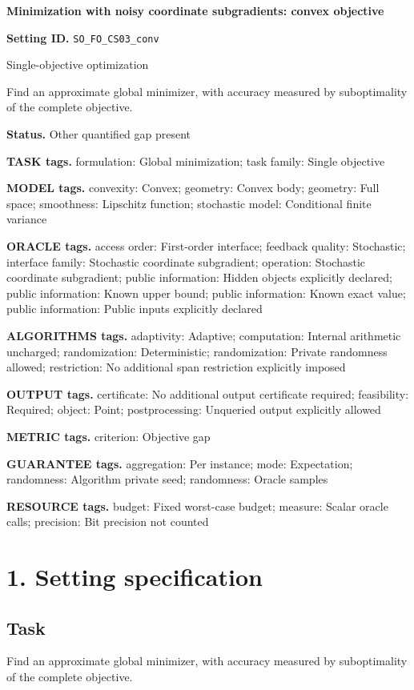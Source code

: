 \documentclass[10pt,a4paper]{article}
\begin{document}
\raggedright

{\LARGE\bfseries\sffamily\color{AtlasNavy} Minimization with noisy coordinate subgradients: convex objective\par}\vspace{5pt}
\textbf{Setting ID.} \texttt{SO\_\allowbreak{}FO\_\allowbreak{}CS03\_\allowbreak{}conv}

Single-objective optimization

Find an approximate global minimizer, with accuracy measured by suboptimality of the complete objective.

\textbf{Status.} Other quantified gap present

\textbf{TASK tags.} formulation: Global minimization; task family: Single objective

\textbf{MODEL tags.} convexity: Convex; geometry: Convex body; geometry: Full space; smoothness: Lipschitz function; stochastic model: Conditional finite variance

\textbf{ORACLE tags.} access order: First-order interface; feedback quality: Stochastic; interface family: Stochastic coordinate subgradient; operation: Stochastic coordinate subgradient; public information: Hidden objects explicitly declared; public information: Known upper bound; public information: Known exact value; public information: Public inputs explicitly declared

\textbf{ALGORITHMS tags.} adaptivity: Adaptive; computation: Internal arithmetic uncharged; randomization: Deterministic; randomization: Private randomness allowed; restriction: No additional span restriction explicitly imposed

\textbf{OUTPUT tags.} certificate: No additional output certificate required; feasibility: Required; object: Point; postprocessing: Unqueried output explicitly allowed

\textbf{METRIC tags.} criterion: Objective gap

\textbf{GUARANTEE tags.} aggregation: Per instance; mode: Expectation; randomness: Algorithm private seed; randomness: Oracle samples

\textbf{RESOURCE tags.} budget: Fixed worst-case budget; measure: Scalar oracle calls; precision: Bit precision not counted

\section{1. Setting specification}
\subsection{Task}
Find an approximate global minimizer, with accuracy measured by suboptimality of the complete objective.
\end{document}
